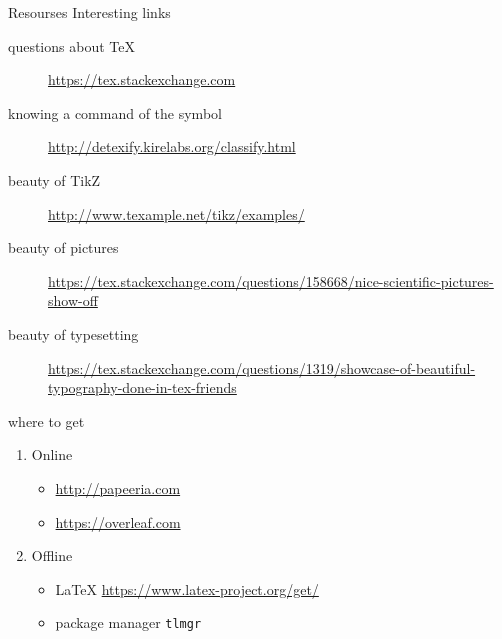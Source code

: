 
\begin{frame}[fragile]{Resourses \magicPage}{Interesting links}
\cprotect{}
\small
\begin{description}
    \item[questions about \TeX] \url{https://tex.stackexchange.com} \vspace{-1ex}
    \item[knowing a command of the symbol] \url{http://detexify.kirelabs.org/classify.html} \vspace{-1ex}
    \item[beauty of TikZ] \url{http://www.texample.net/tikz/examples/} \vspace{-1ex}
    \item[beauty of pictures] \url{https://tex.stackexchange.com/questions/158668/nice-scientific-pictures-show-off}\vspace{-1ex}
    \item[beauty of typesetting] \url{https://tex.stackexchange.com/questions/1319/showcase-of-beautiful-typography-done-in-tex-friends}\vspace{-1ex}
\end{description}
\end{frame}

\begin{frame}[fragile]{where to get}
\begin{enumerate}
    \item Online
    \begin{itemize}
        \item \url{http://papeeria.com}
        \item \url{https://overleaf.com}
    \end{itemize}
    \item Offline
    \begin{itemize}
        \item \LaTeX{} \url{https://www.latex-project.org/get/}
        \item package manager \verb'tlmgr'
    \end{itemize}
\end{enumerate}
     
\end{frame}






